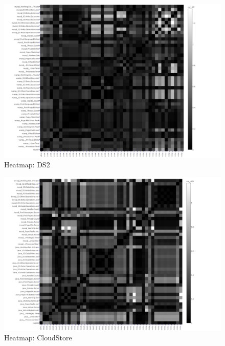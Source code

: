 \begin{figure}[!htbp]
	\centering
	\centerline{
		\includegraphics[width=1.5\textwidth]{ds2_heatmap.pdf}}
	\caption{Heatmap: DS2}
	\captionsetup{justification=centering}
	\label{fig:Results Table}
\end{figure}

\begin{figure}[!htbp]
	\centering
	\centerline{\includegraphics[width=1.5\textwidth]{cloudscale_heatmap.pdf}}
	\caption{Heatmap: CloudStore}
	\captionsetup{justification=centering}
	\label{fig:Results Table}
\end{figure}


